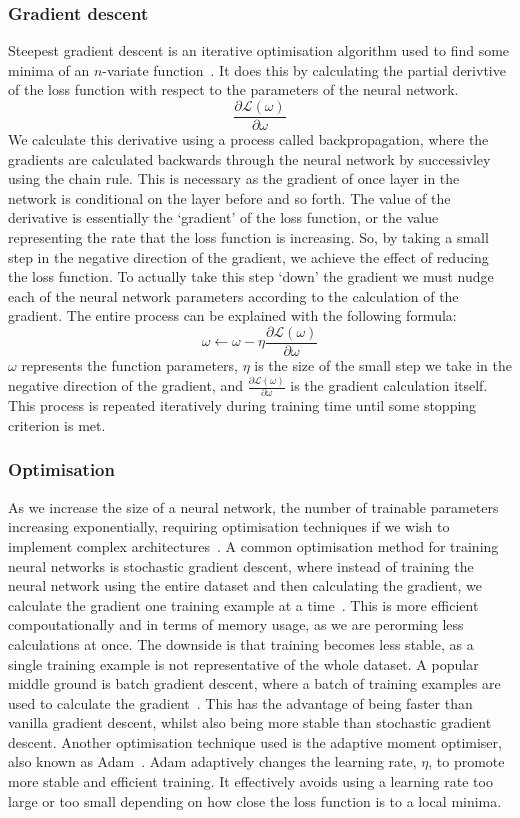 \subsubsection{Gradient descent}\label{subsubsec:sgd}
Steepest gradient descent is an iterative optimisation algorithm used to find some minima of an $n$-variate function~\cite{ref}. It does this by calculating the partial derivtive of the loss function with respect to the parameters of the neural network.
\[\frac{\partial\mathcal{L}(\omega)}{\partial\omega}\]
We calculate this derivative using a process called backpropagation, where the gradients are calculated backwards through the neural network by successivley using the chain rule. This is necessary as the gradient of once layer in the network is conditional on the layer before and so forth. The value of the derivative is essentially the `gradient' of the loss function, or the value representing the rate that the loss function is increasing. So, by taking a small step in the negative direction of the gradient, we achieve the effect of reducing the loss function. To actually take this step `down' the gradient we must nudge each of the neural network parameters according to the calculation of the gradient. The entire process can be explained with the following formula:
\[\omega \leftarrow\omega - \eta\frac{\partial\mathcal{L}(\omega)}{\partial\omega}\]
$\omega$ represents the function parameters, $\eta$ is the size of the small step we take in the negative direction of the gradient, and $\frac{\partial\mathcal{L}(\omega)}{\partial\omega}$ is the gradient calculation itself. This process is repeated iteratively during training time until some stopping criterion is met.

\subsubsection{Optimisation}
As we increase the size of a neural network, the number of trainable parameters increasing exponentially, requiring optimisation techniques if we wish to implement complex architectures~\cite{ref}. A common optimisation method for training neural networks is stochastic gradient descent, where instead of training the neural network using the entire dataset and then calculating the gradient, we calculate the gradient one training example at a time~\cite{ref}. This is more efficient compoutationally and in terms of memory usage, as we are perorming less calculations at once. The downside is that training becomes less stable, as a single training example is not representative of the whole dataset. A popular middle ground is batch gradient descent, where a batch of training examples are used to calculate the gradient~\cite{ref}. This has the advantage of being faster than vanilla gradient descent, whilst also being more stable than stochastic gradient descent. Another optimisation technique used is the adaptive moment optimiser, also known as Adam~\cite{ref}. Adam adaptively changes the learning rate, $\eta$, to promote more stable and efficient training. It effectively avoids using a learning rate too large or too small depending on how close the loss function is to a local minima.

